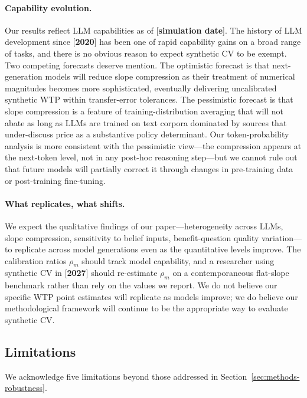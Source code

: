\documentclass[12pt]{article}
\begin{document}
\paragraph{Capability evolution.} Our results reflect LLM capabilities as of [\textbf{simulation date}]. The history of LLM development since [\textbf{2020}] has been one of rapid capability gains on a broad range of tasks, and there is no obvious reason to expect synthetic CV to be exempt. Two competing forecasts deserve mention. The optimistic forecast is that next-generation models will reduce slope compression as their treatment of numerical magnitudes becomes more sophisticated, eventually delivering uncalibrated synthetic WTP within transfer-error tolerances. The pessimistic forecast is that slope compression is a feature of training-distribution averaging that will not abate as long as LLMs are trained on text corpora dominated by sources that under-discuss price as a substantive policy determinant. Our token-probability analysis is more consistent with the pessimistic view---the compression appears at the next-token level, not in any post-hoc reasoning step---but we cannot rule out that future models will partially correct it through changes in pre-training data or post-training fine-tuning.

\paragraph{What replicates, what shifts.} We expect the qualitative findings of our paper---heterogeneity across LLMs, slope compression, sensitivity to belief inputs, benefit-question quality variation---to replicate across model generations even as the quantitative levels improve. The calibration ratios $\rho_m$ should track model capability, and a researcher using synthetic CV in [\textbf{2027}] should re-estimate $\rho_m$ on a contemporaneous flat-slope benchmark rather than rely on the values we report. We do not believe our specific WTP point estimates will replicate as models improve; we do believe our methodological framework will continue to be the appropriate way to evaluate synthetic CV.

\subsection{Limitations}\label{sec:disc-limitations}

We acknowledge five limitations beyond those addressed in Section~\ref{sec:methods-robustness}.
\end{document}
